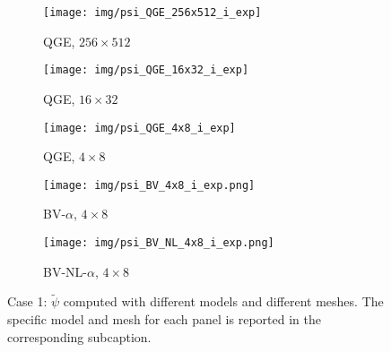 \documentclass[11pt,a4paper]{article}
\begin{document}
\begin{figure}[htb!]
\centering
\begin{subfigure}{0.193\textwidth}
         \centering
         \texttt{[image: img/psi\_QGE\_256x512\_i\_exp]}
         \caption{\scriptsize{QGE, $256\times512$}}
     \end{subfigure}
\begin{subfigure}{0.193\textwidth}
         \centering
         \texttt{[image: img/psi\_QGE\_16x32\_i\_exp]}
         \caption{\scriptsize{QGE, $16 \times 32$}}
     \end{subfigure}
\begin{subfigure}{0.193\textwidth}
         \centering
         \texttt{[image: img/psi\_QGE\_4x8\_i\_exp]}
         \caption{\scriptsize{QGE, $4 \times 8$}}
     \end{subfigure}
\begin{subfigure}{0.193\textwidth}
         \centering
         \texttt{[image: img/psi\_BV\_4x8\_i\_exp.png]}
         \caption{\scriptsize{BV-$\alpha$, $4 \times 8$}}
     \end{subfigure}
\begin{subfigure}{0.193\textwidth}
         \centering
         \texttt{[image: img/psi\_BV\_NL\_4x8\_i\_exp.png]}
         \caption{\scriptsize{BV-NL-$\alpha$, $4 \times 8$}}
     \end{subfigure}
\caption{Case 1: $\widetilde{\psi}$ computed with different models and different meshes. 
The specific model and mesh for each panel is reported in the corresponding subcaption.}
\label{fig:psi_first}
\end{figure}
\end{document}

